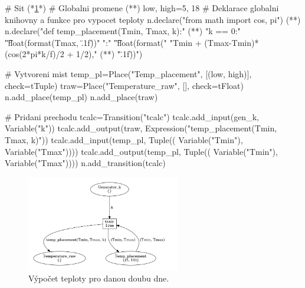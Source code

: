 \begin{python}
  # Sit (*\ref{therm-calc-viz}*)
  # Globalni promene (*\label{code:therm-calc-draw}*)
  low, high=5, 18
  # Deklarace globalni knihovny a funkce pro vypocet teploty
  n.declare("from math import cos, pi") (*\label{code:decl-libs}*)
  n.declare("def temp_placement(Tmin, Tmax, k):" (*\label{code:decl-func}*)
  "\n\tif k == 0:"
  "\n\t\treturn float(format(Tmax, \".1f\"))"
  "\n\telse:"
  "\n\t\treturn float(format("
  "Tmin + (Tmax-Tmin)*(cos(2*pi*k/f)/2 + 1/2)," (*\label{code:lib-import-usage}*)
  "\".1f\"))")

  # Vytvoreni mist
  temp_pl=Place("Temp_placement", [(low, high)], check=tTuple)
  traw=Place("Temperature_raw", [], check=tFloat)
  n.add_place(temp_pl)
  n.add_place(traw)

  # Pridani prechodu
  tcalc=Transition("tcalc")
  tcalc.add_input(gen_k, Variable("k"))
  tcalc.add_output(traw, Expression("temp_placement(Tmin, Tmax, k)"))
  tcalc.add_input(temp_pl, Tuple((
    Variable("Tmin"), Variable("Tmax"))))
  tcalc.add_output(temp_pl, Tuple((
    Variable("Tmin"), Variable("Tmax"))))
  n.add_transition(tcalc)
\end{python}

\begin{figure}[htb]
  \centering
  \includegraphics[width=0.6\textwidth]{obrazky-figures/calc.png}
  \caption{Výpočet teploty pro danou doubu dne.}
  \label{therm-calc-viz}
\end{figure}


